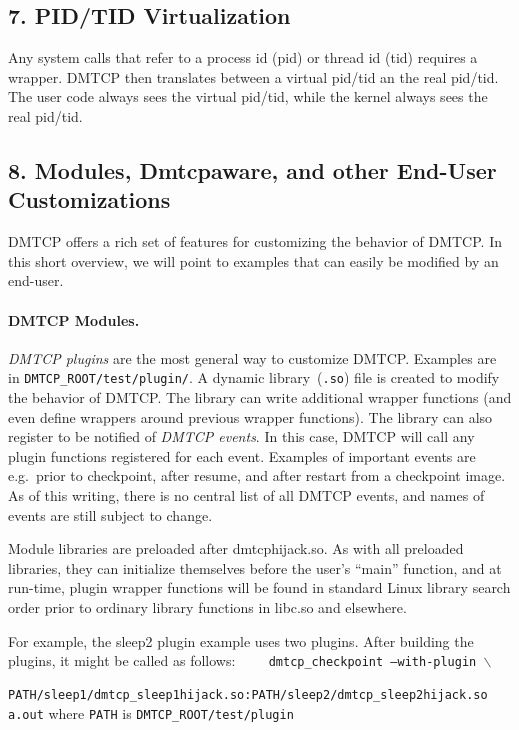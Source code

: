 \documentclass{article}
\begin{document}
\subsection*{7. PID/TID Virtualization}

Any system calls that refer to a process id (pid) or thread id (tid) requires
a wrapper.  DMTCP then translates between a virtual pid/tid an the
real pid/tid.  The user code always sees the virtual pid/tid, while
the kernel always sees the real pid/tid.

\newpage

\subsection*{8. Modules, Dmtcpaware, and other End-User Customizations}

DMTCP offers a rich set of features for customizing the behavior of
DMTCP.  In this short overview, we will point to examples that can
easily be modified by an end-user.

\paragraph{DMTCP Modules.}

{\em DMTCP plugins\/} are the most general way to customize DMTCP.  Examples
are in {\tt DMTCP\_ROOT/test/plugin/}.  A dynamic library~({\tt *.so})
file is created to modify the behavior of DMTCP.  The library can
write additional wrapper functions (and even define wrappers around
previous wrapper functions).  The library can also register
to be notified of {\em DMTCP events}.  In this case, DMTCP will
call any plugin functions registered for each event.
Examples of important events are
\hbox{e.g.}~prior to checkpoint, after resume, and after restart
from a checkpoint image.  As of this writing, there is no central
list of all DMTCP events, and names of events are still subject to change.

Module libraries are preloaded after dmtcphijack.so.  As with all
preloaded libraries, they can initialize themselves before the user's
``main'' function, and at run-time, plugin wrapper functions will
be found in standard Linux library search order prior to ordinary
library functions in libc.so and elsewhere.

For example, the sleep2 plugin example uses two plugins.  After building
the plugins, it might be called as follows: \newline
{\tt
\hbox{\ \ }  dmtcp\_checkpoint --with-plugin $\backslash$ \newline
\hbox{\ \ \ \ }
 PATH/sleep1/dmtcp\_sleep1hijack.so:PATH/sleep2/dmtcp\_sleep2hijack.so a.out}
 \newline
where {\tt PATH} is {\tt DMTCP\_ROOT/test/plugin}
\end{document}
